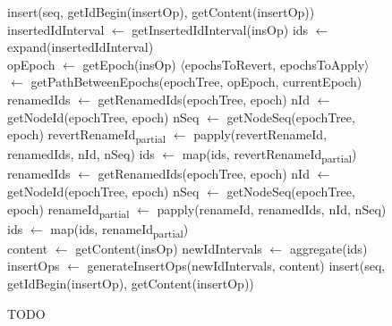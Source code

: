 \documentclass[12pt]{thesul}
\begin{document}
\begin{figure}[!ht]
  \footnotesize
  \begin{algorithmic}[5]
            \State insert(seq, getIdBegin(insertOp), getContent(insertOp)) \label{alg:insertRemote-insert-1}
          \Else
            \State insertedIdInterval $\gets$ getInsertedIdInterval(insOp) \label{alg:insertRemote-get-ids}
            \State ids $\gets$ expand(insertedIdInterval)
            \\
            \State opEpoch $\gets$ getEpoch(insOp)
            \State $\langle$epochsToRevert, epochsToApply$\rangle$ $\gets$ getPathBetweenEpochs(epochTree, opEpoch, currentEpoch) \label{alg:insertRemote-get-path}
            \\
              \State renamedIds $\gets$ getRenamedIds(epochTree, epoch) \label{alg:insertRemote-retrieve-rename-data-1}
              \State nId $\gets$ getNodeId(epochTree, epoch)
              \State nSeq $\gets$ getNodeSeq(epochTree, epoch) \label{alg:insertRemote-retrieve-rename-data-2}
              \State revertRenameId\textsubscript{partial} $\gets$ papply(revertRenameId, renamedIds, nId, nSeq)
              \State ids $\gets$ map(ids, revertRenameId\textsubscript{partial}) \label{alg:insertRemote-revertRenameId}
            \EndFor
            \\
             \label{alg:insertRemote-renameId-1}
              \State renamedIds $\gets$ getRenamedIds(epochTree, epoch)
              \State nId $\gets$ getNodeId(epochTree, epoch)
              \State nSeq $\gets$ getNodeSeq(epochTree, epoch)
              \State renameId\textsubscript{partial} $\gets$ papply(renameId, renamedIds, nId, nSeq)
              \State ids $\gets$ map(ids, renameId\textsubscript{partial})
            \EndFor \label{alg:insertRemote-renameId-2}
            \\
            \State content $\gets$ getContent(insOp)
            \State newIdIntervals $\gets$ aggregate(ids) \label{alg:insertRemote-aggregate}
            \State insertOps $\gets$ generateInsertOps(newIdIntervals, content) \label{alg:insertRemote-generate}
              \State insert(seq, getIdBegin(insertOp), getContent(insertOp)) \label{alg:insertRemote-insert-2}
            \EndFor
        \EndIf
      \EndFunction
  \end{algorithmic}
  \caption{TODO}
  \label{alg:insertRemote}
\end{figure}
\end{document}
